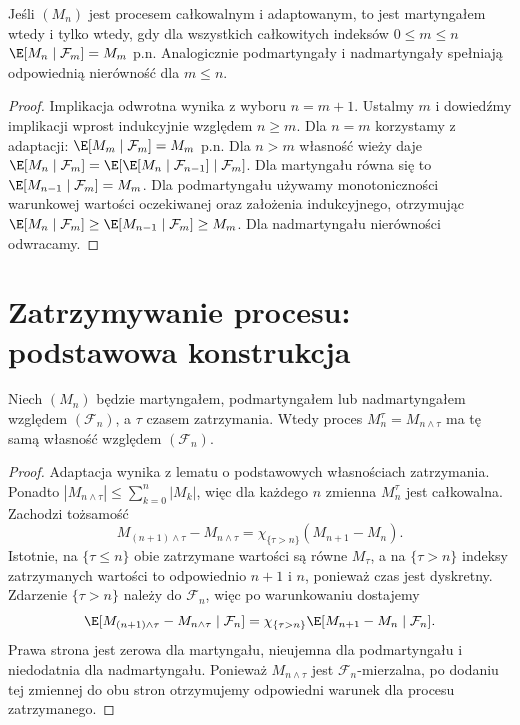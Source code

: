 \begin{twierdzenie}
Jeśli $(M_n)$ jest procesem całkowalnym i
adaptowanym, to jest martyngałem wtedy i tylko wtedy,
gdy dla wszystkich całkowitych indeksów $0\leq m\leq n$
$\E[M_n\mid\mathcal F_m]=M_m$ p.n.
Analogicznie podmartyngały i nadmartyngały
spełniają odpowiednią nierówność dla $m\leq n$.
\end{twierdzenie}
\begin{proof}
Implikacja odwrotna wynika z wyboru $n=m+1$.
Ustalmy $m$ i dowiedźmy implikacji wprost
indukcyjnie względem $n\geq m$.
Dla $n=m$ korzystamy z adaptacji:
$\E[M_m\mid\mathcal F_m]=M_m$ p.n.
Dla $n>m$ własność wieży daje
$\E[M_n\mid\mathcal F_m]
=\E[\E[M_n\mid\mathcal F_{n-1}]\mid\mathcal F_m]$.
Dla martyngału równa się to
$\E[M_{n-1}\mid\mathcal F_m]=M_m$.
Dla podmartyngału używamy monotoniczności
warunkowej wartości oczekiwanej oraz założenia
indukcyjnego, otrzymując
$\E[M_n\mid\mathcal F_m]\geq
\E[M_{n-1}\mid\mathcal F_m]\geq M_m$.
Dla nadmartyngału nierówności odwracamy.
\end{proof}

\section{Zatrzymywanie procesu: podstawowa konstrukcja}

\begin{twierdzenie}
Niech $(M_n)$ będzie martyngałem, podmartyngałem
lub nadmartyngałem względem $(\mathcal F_n)$,
a $\tau$ czasem zatrzymania. Wtedy proces
$M_n^\tau=M_{n\wedge\tau}$ ma tę samą własność
względem $(\mathcal F_n)$.
\end{twierdzenie}
\begin{proof}
Adaptacja wynika z lematu o podstawowych
własnościach zatrzymania. Ponadto
$|M_{n\wedge\tau}|\leq\sum_{k=0}^n|M_k|$,
więc dla każdego $n$ zmienna $M_n^\tau$ jest
całkowalna. Zachodzi tożsamość
\[
M_{(n+1)\wedge\tau}-M_{n\wedge\tau}
=\chi_{\{\tau>n\}}(M_{n+1}-M_n).
\]
Istotnie, na $\{\tau\leq n\}$ obie zatrzymane
wartości są równe $M_\tau$, a na $\{\tau>n\}$
indeksy zatrzymanych wartości to odpowiednio
$n+1$ i $n$, ponieważ czas jest dyskretny.
Zdarzenie $\{\tau>n\}$ należy do $\mathcal F_n$,
więc po warunkowaniu dostajemy
\[
\E[M_{(n+1)\wedge\tau}-M_{n\wedge\tau}
\mid\mathcal F_n]
=\chi_{\{\tau>n\}}\E[M_{n+1}-M_n\mid\mathcal F_n].
\]
Prawa strona jest zerowa dla martyngału,
nieujemna dla podmartyngału i niedodatnia
dla nadmartyngału. Ponieważ $M_{n\wedge\tau}$
jest $\mathcal F_n$-mierzalna, po dodaniu tej
zmiennej do obu stron otrzymujemy odpowiedni
warunek dla procesu zatrzymanego.
\end{proof}

